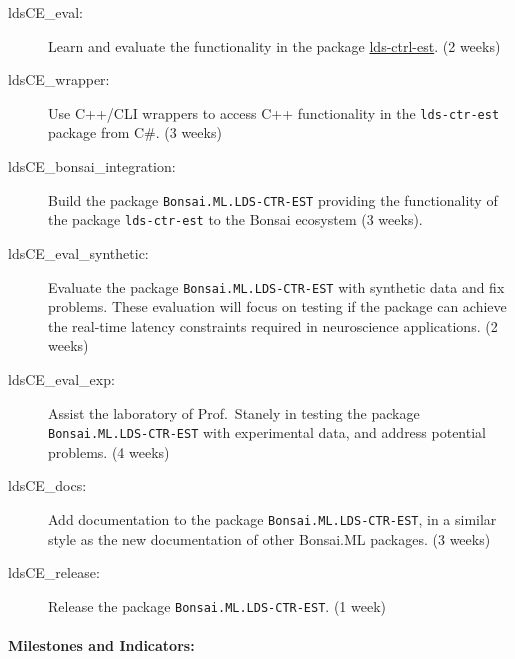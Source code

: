 \begin{description}

    \item[ldsCE\_eval:] Learn and evaluate the functionality in the
        package
        \href{https://github.com/CLOCTools/lds-ctrl-est}{lds-ctrl-est}. (2
        weeks)

    \item[ldsCE\_wrapper:] Use C++/CLI wrappers to access C++
        functionality in the \texttt{lds-ctr-est} package from C\#. (3 weeks)

    \item[ldsCE\_bonsai\_integration:] Build the package
        \texttt{Bonsai.ML.LDS-CTR-EST} providing the functionality of the
        package \texttt{lds-ctr-est} to the Bonsai ecosystem (3 weeks).

    \item[ldsCE\_eval\_synthetic:] Evaluate the package
        \texttt{Bonsai.ML.LDS-CTR-EST} with synthetic data and fix problems.
        These evaluation will focus on testing if the package can achieve the
        real-time latency constraints required in neuroscience applications. (2
        weeks)

    \item[ldsCE\_eval\_exp:] Assist the laboratory of Prof.~Stanely in testing
        the package \texttt{Bonsai.ML.LDS-CTR-EST} with experimental data, and
        address potential problems. (4 weeks)

    \item[ldsCE\_docs:] Add documentation to the package
        \texttt{Bonsai.ML.LDS-CTR-EST}, in a similar style as the new
        documentation of other Bonsai.ML packages.  (3 weeks)

    \item[ldsCE\_release:] Release the package \texttt{Bonsai.ML.LDS-CTR-EST}.
        (1 week)

\end{description}

\paragraph{Milestones and Indicators:}\mbox{}\\

